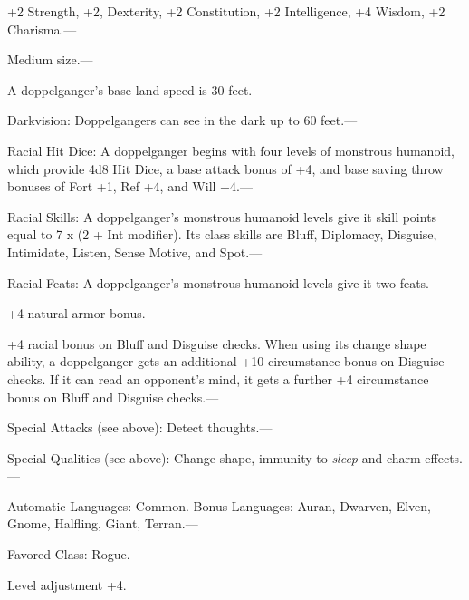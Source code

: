 \documentclass{article}
\begin{document}
\parindent=3pt
+2 Strength, +2, Dexterity, +2 Constitution, +2 Intelligence, +4 Wisdom, +2 Charisma.---

\parindent=0pt
Medium size.---

A doppelganger's base land speed is 30 feet.---

Darkvision: Doppelgangers can see in the dark up to 60 feet.---

Racial Hit Dice: A doppelganger begins with four levels of monstrous humanoid, 
which provide 4d8 Hit Dice, a base attack bonus of +4, and base saving throw bonuses 
of Fort +1, Ref +4, and Will +4.---

Racial Skills: A doppelganger's monstrous humanoid levels give it skill points 
equal to 7 x (2 + Int modifier). Its class skills are Bluff, Diplomacy, Disguise, 
Intimidate, Listen, Sense Motive, and Spot.---

Racial Feats: A doppelganger's monstrous humanoid levels give it two feats.--- 

\parindent=3pt
+4 natural armor bonus.--- 

+4 racial bonus on Bluff and Disguise checks. When using its change shape ability, 
a doppelganger gets an additional +10 circumstance bonus on Disguise checks. If 
it can read an opponent's mind, it gets a further +4 circumstance bonus on Bluff 
and Disguise checks.---

Special Attacks (see above): Detect thoughts.---

Special Qualities (see above): Change shape, immunity to \textit{sleep }and charm 
effects.---

\parindent=0pt
Automatic Languages: Common. Bonus Languages: Auran, Dwarven, Elven, Gnome, Halfling, 
Giant, Terran.---

Favored Class: Rogue.---

Level adjustment +4. 

\newpage
\end{document}
